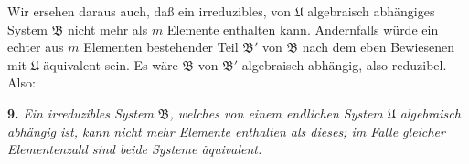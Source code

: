 Wir ersehen daraus auch, daß ein irreduzibles, von $\mathfrak U$ algebraisch abhängiges System $\mathfrak B$ nicht mehr als $m$ Elemente enthalten kann. Andernfalls würde ein echter aus $m$ Elementen bestehender Teil $\mathfrak B'$ von $\mathfrak B$ nach dem eben Bewiesenen mit $\mathfrak U$ äquivalent sein. Es wäre $\mathfrak B$ von $\mathfrak B'$ algebraisch abhängig, also reduzibel. Also:

\textbf{9.} \emph{Ein irreduzibles System $\mathfrak B$, welches von einem endlichen System $\mathfrak U$ algebraisch abhängig ist, kann nicht mehr Elemente enthalten als dieses; im Falle gleicher Elementenzahl sind beide Systeme äquivalent.}
